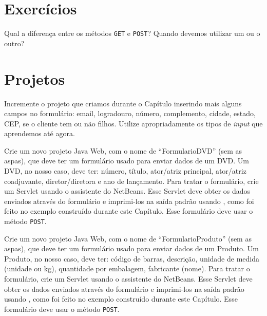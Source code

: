 \section{Exercícios}

\begin{exercicioSemArquivo}{}{}{}
    Qual a diferença entre os métodos \texttt{GET} e \texttt{POST}? Quando devemos utilizar um ou o outro?
\end{exercicioSemArquivo}

\section{Projetos}

\begin{projetoSemArquivo}{}{}{}
    Incremente o projeto que criamos durante o Capítulo inserindo mais alguns campos no formulário: email, logradouro, número, complemento, cidade, estado, CEP, se o cliente tem ou não filhos. Utilize apropriadamente os tipos de \textit{input} que aprendemos até agora.
\end{projetoSemArquivo}

\begin{projetoSemArquivo}{}{}{}
    Crie um novo projeto Java Web, com o nome de ``FormularioDVD'' (sem as aspas), que deve ter um formulário usado para enviar dados de um DVD. Um DVD, no nosso caso, deve ter: número, título, ator/atriz principal, ator/atriz coadjuvante, diretor/diretora e ano de lançamento. Para tratar o formulário, crie um Servlet usando o assistente do NetBeans. Esse Servlet deve obter os dados enviados através do formulário e imprimi-los na saída padrão usando , como foi feito no exemplo construído durante este Capítulo. Esse formulário deve usar o método \texttt{POST}.
\end{projetoSemArquivo}

\begin{projetoSemArquivo}{}{}{}
    Crie um novo projeto Java Web, com o nome de ``FormularioProduto'' (sem as aspas), que deve ter um formulário usado para enviar dados de um Produto. Um Produto, no nosso caso, deve ter: código de barras, descrição, unidade de medida (unidade ou kg), quantidade por embalagem, fabricante (nome). Para tratar o formulário, crie um Servlet usando o assistente do NetBeans. Esse Servlet deve obter os dados enviados através do formulário e imprimi-los na saída padrão usando , como foi feito no exemplo construído durante este Capítulo. Esse formulário deve usar o método \texttt{POST}.
\end{projetoSemArquivo}

